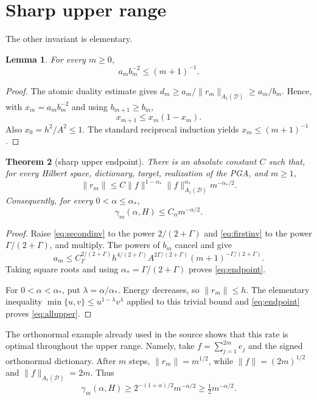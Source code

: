 \documentclass[11pt]{article}
\newtheorem{theorem}{Theorem}
\newtheorem{lemma}[theorem]{Lemma}
\newcommand{\Aone}{A_1(\mathcal D)}
\begin{document}
\section{Sharp upper range}

The other invariant is elementary.

\begin{lemma}\label{lem:first}
For every $m\geq0$,
\begin{equation}\label{eq:firstinv}
 a_mb_m^{-2}\leq (m+1)^{-1}.
\end{equation}
\end{lemma}

\begin{proof}
The atomic duality estimate gives
$d_m\geq a_m/\|r_m\|_{\Aone}\geq a_m/b_m$.  Hence, with
$x_m=a_mb_m^{-2}$ and using $b_{m+1}\geq b_m$,
\[
 x_{m+1}\leq x_m(1-x_m).
\]
Also $x_0=h^2/A^2\leq1$.  The standard reciprocal induction yields
$x_m\leq(m+1)^{-1}$.
\end{proof}

\begin{theorem}[sharp upper endpoint]\label{thm:upper}
There is an absolute constant $C$ such that, for every Hilbert space,
dictionary, target, realization of the PGA, and $m\geq1$,
\begin{equation}\label{eq:endpoint}
 \|r_m\|\leq C
 \|f\|^{1-\alpha_*}\|f\|_{\Aone}^{\alpha_*}
 m^{-\alpha_*/2}.
\end{equation}
Consequently, for every $0<\alpha\leq\alpha_*$,
\begin{equation}\label{eq:allupper}
 \gamma_m(\alpha,H)\leq C_\alpha m^{-\alpha/2}.
\end{equation}
\end{theorem}

\begin{proof}
Raise \eqref{eq:secondinv} to the power $2/(2+\Gamma)$ and
\eqref{eq:firstinv} to the power $\Gamma/(2+\Gamma)$, and multiply.  The
powers of $b_m$ cancel and give
\[
 a_m\leq C_\Gamma^{2/(2+\Gamma)}
 h^{4/(2+\Gamma)}A^{2\Gamma/(2+\Gamma)}
 (m+1)^{-\Gamma/(2+\Gamma)}.
\]
Taking square roots and using
$\alpha_*=\Gamma/(2+\Gamma)$ proves \eqref{eq:endpoint}.

For $0<\alpha<\alpha_*$, put $\lambda=\alpha/\alpha_*$.  Energy decreases,
so $\|r_m\|\leq h$.  The elementary inequality
$\min\{u,v\}\leq u^{1-\lambda}v^\lambda$ applied to this trivial bound and
\eqref{eq:endpoint} proves \eqref{eq:allupper}.
\end{proof}

The orthonormal example already used in the source shows that this rate is
optimal throughout the upper range.  Namely, take
$f=\sum_{j=1}^{2m}e_j$ and the signed orthonormal dictionary.  After $m$
steps, $\|r_m\|=m^{1/2}$, while $\|f\|=(2m)^{1/2}$ and
$\|f\|_{\Aone}=2m$.  Thus
\begin{equation}\label{eq:ortholower}
 \gamma_m(\alpha,H)\geq
 2^{-(1+\alpha)/2}m^{-\alpha/2}
 \geq\tfrac12m^{-\alpha/2}.
\end{equation}
\end{document}

